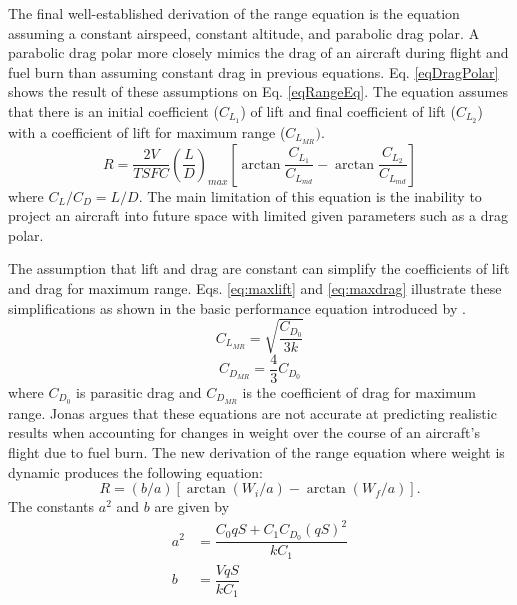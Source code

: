 The final well-established derivation of the range equation is the equation assuming a constant airspeed, constant altitude, and parabolic drag polar. A parabolic drag polar more closely mimics the drag of an aircraft during flight and fuel burn than assuming constant drag in previous equations. Eq. \ref{eqDragPolar} shows the result of these assumptions on Eq. \ref{eqRangeEq}. The equation assumes that there is an initial coefficient ($C_{L_1}$) of lift and final coefficient of lift ($C_{L_2}$) with a coefficient of lift for maximum range ($C_{L_{MR}})$.
\begin{equation}
\label{eqDragPolar}
    R = \dfrac{2V}{TSFC}\left(\dfrac{L}{D}\right)_{max}\left[\arctan\dfrac{C_{L_1}}{C_{L_{md}}}-\arctan\dfrac{C_{L_2}}{C_{L_{md}}}\right]
\end{equation}
where $C_L/C_D = L/D$. The main limitation of this equation is the inability to project an aircraft into future space with limited given parameters such as a drag polar.\par
The assumption that lift and drag are constant can simplify the coefficients of lift and drag for maximum range. Eqs. \ref{eq:maxlift} and \ref{eq:maxdrag} illustrate these simplifications as shown in the basic performance equation introduced by \cite{OptimizeBreguet}.
\begin{equation}
C_{L_{MR}} = \sqrt{\dfrac{C_{D_0}}{3k}}
\label{eq:maxlift}
\end{equation}
\begin{equation}
C_{D_{MR}} = \dfrac{4}{3}C_{D_0}
\label{eq:maxdrag}
\end{equation}
where $C_{D_0}$ is parasitic drag and $C_{D_{MR}}$ is the coefficient of drag for maximum range. Jonas \cite{Jonas} argues that these equations are not accurate at predicting realistic results when accounting for changes in weight over the course of an aircraft's flight due to fuel burn. The new derivation of the range equation \cite{Jonas} where weight is dynamic produces the following equation:
\begin{equation}
    R = (b/a)[\arctan(W_i/a)-\arctan(W_f/a)].
    \label{eq:dynamicrange}
\end{equation}
The constants $a^2$ and $b$ are given by 
\begin{equation}
    \begin{aligned}
        a^2 &= \dfrac{C_0qS+C_1C_{D_0}(qS)^2}{k C_1}\\
        b &= \dfrac{VqS}{k C_1}
    \end{aligned}
\end{equation}
